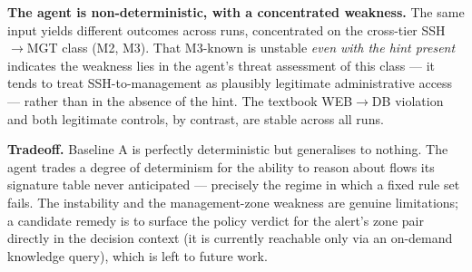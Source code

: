 \textbf{The agent is non-deterministic, with a concentrated weakness.} The same
input yields different outcomes across runs, concentrated on the cross-tier
SSH$\rightarrow$MGT class (M2, M3). That M3-known is unstable \emph{even with the
hint present} indicates the weakness lies in the agent's threat assessment of this
class --- it tends to treat SSH-to-management as plausibly legitimate administrative
access --- rather than in the absence of the hint. The textbook WEB$\rightarrow$DB
violation and both legitimate controls, by contrast, are stable across all runs.

\textbf{Tradeoff.} Baseline A is perfectly deterministic but generalises to nothing.
The agent trades a degree of determinism for the ability to reason about flows its
signature table never anticipated --- precisely the regime in which a fixed rule set
fails. The instability and the management-zone weakness are genuine limitations; a
candidate remedy is to surface the policy verdict for the alert's zone pair directly
in the decision context (it is currently reachable only via an on-demand knowledge
query), which is left to future work.
